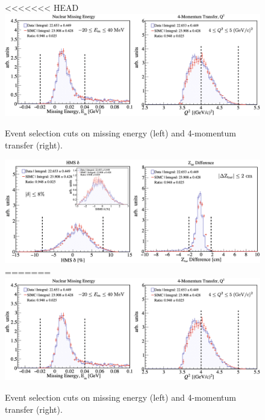 \documentclass[aps, prl]{revtex4-2}  %
\providecommand{\DIFaddbeginFL}{} %
\providecommand{\DIFaddendFL}{} %
\providecommand{\DIFdelbeginFL}{} %
\providecommand{\DIFdelendFL}{} %
\newcommand{\DIFscaledelfig}{0.5}
\newlength{\DIFdelgraphicswidth} %
\newlength{\DIFdelgraphicsheight} %
\newcommand{\DIFaddincludegraphics}[2][]{{\color{blue}\fbox{\DIFOincludegraphics[#1]{#2}}}} %
\newcommand{\DIFdelincludegraphics}[2][]{%
\sbox{\DIFdelgraphicsbox}{\DIFOincludegraphics[#1]{#2}}%
\settoboxwidth{\DIFdelgraphicswidth}{\DIFdelgraphicsbox} %
\settoboxtotalheight{\DIFdelgraphicsheight}{\DIFdelgraphicsbox} %
\scalebox{\DIFscaledelfig}{%
\parbox[b]{\DIFdelgraphicswidth}{\usebox{\DIFdelgraphicsbox}\\[-\baselineskip] \rule{\DIFdelgraphicswidth}{0em}}\llap{\resizebox{\DIFdelgraphicswidth}{\DIFdelgraphicsheight}{%
\setlength{\unitlength}{\DIFdelgraphicswidth}%
\begin{picture}(1,1)%
\thicklines\linethickness{2pt} %
{\color[rgb]{1,0,0}\put(0,0){\framebox(1,1){}}}%
{\color[rgb]{1,0,0}\put(0,0){\line( 1,1){1}}}%
{\color[rgb]{1,0,0}\put(0,1){\line(1,-1){1}}}%
\end{picture}%
}\hspace*{3pt}}} %
} %
\DeclareRobustCommand{\DIFaddbeginFL}{\DIFOaddbeginFL \let\includegraphics\DIFaddincludegraphics} %
\DeclareRobustCommand{\DIFaddendFL}{\DIFOaddendFL \let\includegraphics\DIFOincludegraphics} %
\DeclareRobustCommand{\DIFdelbeginFL}{\DIFOdelbeginFL \let\includegraphics\DIFdelincludegraphics} %
\DeclareRobustCommand{\DIFdelendFL}{\DIFOaddendFL \let\includegraphics\DIFOincludegraphics} %
\begin{document}
\begin{figure}[!h]
<<<<<<< HEAD
\DIFdelbeginFL %
\DIFdelendFL \DIFaddbeginFL \includegraphics[scale=0.24]{plots/Em_and_Q2_CUT_80MeV_35deg.png}
\DIFaddendFL \caption{Event selection cuts on missing energy (left) and 4-momentum transfer (right).}
\label{fig:Em_Q2_cuts}
\DIFdelbeginFL %
\DIFdelendFL \DIFaddbeginFL \includegraphics[scale=0.24]{plots/deltaAcc_and_ZtarCUT_80MeV_35deg.png}
=======
\DIFdelbeginFL %
\DIFdelendFL \DIFaddbeginFL \includegraphics[scale=0.33]{plots/Em_and_Q2_CUT_80MeV_35deg.png}
\DIFaddendFL \caption{Event selection cuts on missing energy (left) and 4-momentum transfer (right).}
\label{fig:Em_Q2_cuts}
\DIFdelbeginFL %

\end{figure}
\end{document}
